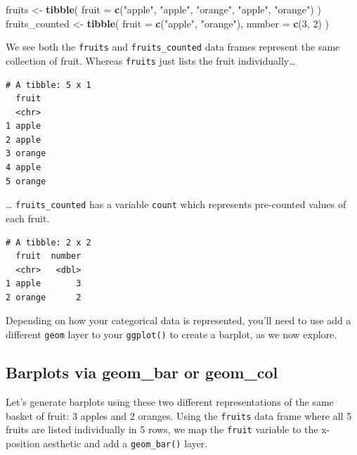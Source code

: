 \documentclass[12pt, krantz2,]{krantz}
\makeatletter
\newenvironment{Shaded}{\begin{snugshade}}{\end{snugshade}}
\newcommand{\DataTypeTok}[1]{\textcolor[rgb]{0.27,0.27,0.27}{#1}}
\newcommand{\DecValTok}[1]{\textcolor[rgb]{0.06,0.06,0.06}{#1}}
\newcommand{\KeywordTok}[1]{\textcolor[rgb]{0.27,0.27,0.27}{\textbf{#1}}}
\newcommand{\NormalTok}[1]{#1}
\newcommand{\StringTok}[1]{\textcolor[rgb]{0.5,0.5,0.5}{#1}}
\newenvironment{kframe}{%
\medskip{}
\setlength{\fboxsep}{.8em}
 \def\at@end@of@kframe{}%
 \ifinner\ifhmode%
  \def\at@end@of@kframe{\end{minipage}}%
  \begin{minipage}{\columnwidth}%
 \fi\fi%
 \def\FrameCommand##1{\hskip\@totalleftmargin \hskip-\fboxsep
 \colorbox{shadecolor}{##1}\hskip-\fboxsep
     \hskip-\linewidth \hskip-\@totalleftmargin \hskip\columnwidth}%
 \MakeFramed {\advance\hsize-\width
   \@totalleftmargin\z@ \linewidth\hsize
   \@setminipage}}%
 {\par\unskip\endMakeFramed%
 \at@end@of@kframe}
\renewenvironment{Shaded}{\begin{kframe}}{\end{kframe}}
\makeatother
\begin{document}
\begin{Shaded}
\begin{Highlighting}[]
\NormalTok{fruits <-}\StringTok{ }\KeywordTok{tibble}\NormalTok{(}
  \DataTypeTok{fruit =} \KeywordTok{c}\NormalTok{(}\StringTok{"apple"}\NormalTok{, }\StringTok{"apple"}\NormalTok{, }\StringTok{"orange"}\NormalTok{, }\StringTok{"apple"}\NormalTok{, }\StringTok{"orange"}\NormalTok{)}
\NormalTok{)}
\NormalTok{fruits_counted <-}\StringTok{ }\KeywordTok{tibble}\NormalTok{(}
  \DataTypeTok{fruit =} \KeywordTok{c}\NormalTok{(}\StringTok{"apple"}\NormalTok{, }\StringTok{"orange"}\NormalTok{),}
  \DataTypeTok{number =} \KeywordTok{c}\NormalTok{(}\DecValTok{3}\NormalTok{, }\DecValTok{2}\NormalTok{)}
\NormalTok{)}
\end{Highlighting}
\end{Shaded}

We see both the \texttt{fruits} and \texttt{fruits\_counted} data frames represent the same collection of fruit. Whereas \texttt{fruits} just lists the fruit individually\ldots{}

\begin{verbatim}
# A tibble: 5 x 1
  fruit 
  <chr> 
1 apple 
2 apple 
3 orange
4 apple 
5 orange
\end{verbatim}

\ldots{} \texttt{fruits\_counted} has a variable \texttt{count} which represents pre-counted values of each fruit.

\begin{verbatim}
# A tibble: 2 x 2
  fruit  number
  <chr>   <dbl>
1 apple       3
2 orange      2
\end{verbatim}

Depending on how your categorical data is represented, you'll need to use add a different \texttt{geom} layer to your \texttt{ggplot()} to create a barplot, as we now explore.

\hypertarget{barplots-via-geom_bar-or-geom_col}{%
\subsection{Barplots via geom\_bar or geom\_col}\label{barplots-via-geom_bar-or-geom_col}}

Let's generate barplots using these two different representations of the same basket of fruit: 3 apples and 2 oranges. Using the \texttt{fruits} data frame where all 5 fruits are listed individually in 5 rows, we map the \texttt{fruit} variable to the x-position aesthetic and add a \texttt{geom\_bar()} layer.
\end{document}
